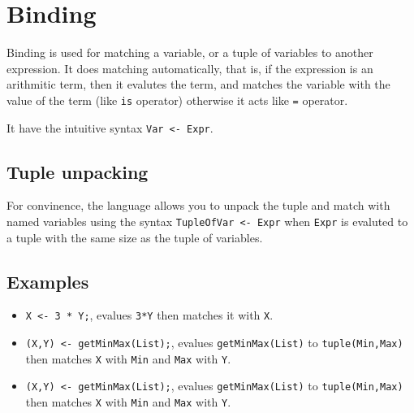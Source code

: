 \section{Binding}

Binding is used for matching a variable, or a tuple of variables to
another expression. It does matching automatically, that is, if the
expression is an arithmitic term, then it evalutes the term, and
matches the variable with the value of the term (like \texttt{is}
operator) otherwise it acts like \texttt{=} operator.

It have the intuitive syntax \texttt{Var <- Expr}. 

\subsection{Tuple unpacking}

For convinence, the language allows you to unpack the tuple and match with named variables
using the syntax \texttt{TupleOfVar <- Expr} when \texttt{Expr} is evaluted to a tuple with
the same size as the tuple of variables.

\subsection{Examples}

\begin{itemize}
	\item \texttt{X <- 3 * Y;}, evalues \texttt{3*Y} then matches it with \texttt{X}.
	\item \texttt{(X,Y) <- getMinMax(List);}, evalues \texttt{getMinMax(List)} to \texttt{tuple(Min,Max)} then
	      matches \texttt{X} with \texttt{Min} and \texttt{Max} with \texttt{Y}.
	\item \texttt{(X,Y) <- getMinMax(List);}, evalues \texttt{getMinMax(List)} to \texttt{tuple(Min,Max)} then
	      matches \texttt{X} with \texttt{Min} and \texttt{Max} with \texttt{Y}.
\end{itemize}


